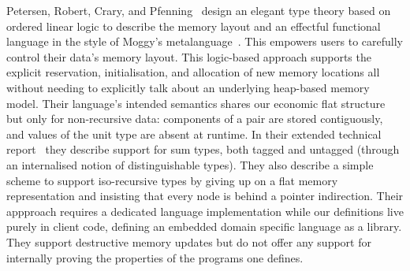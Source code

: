 Petersen, Robert, Crary, and Pfenning~\citeyearpar{DBLP:conf/popl/PetersenHCP03}
design an elegant type theory based on ordered linear logic
to describe the memory layout and an effectful functional
language in the style of Moggy's
metalanguage~\citeyearpar{DBLP:journals/iandc/Moggi91}.
This empowers users to carefully control their data's memory
layout.
%
This logic-based approach supports the explicit reservation,
initialisation, and allocation of new memory locations all
without needing to explicitly talk about an underlying
heap-based memory model.
%
Their language's intended semantics shares our economic flat
structure but only for non-recursive data: components of a
pair are stored contiguously, and values of the unit type are
absent at runtime.
%
In their extended technical report~\citeyearpar{MANUAL:report/cmu/PetersenHCP03}
they describe support for sum types, both tagged and untagged
(through an internalised notion of distinguishable types).
They also describe a simple scheme to support iso-recursive types
by giving up on a flat memory representation and insisting that
every node is behind a pointer indirection.
%
Their appproach requires a dedicated language implementation
while our definitions live purely in client code, defining
an embedded domain specific language as a library.
%
They support destructive memory updates but do not offer any
support for internally proving the properties of the programs
one defines.
